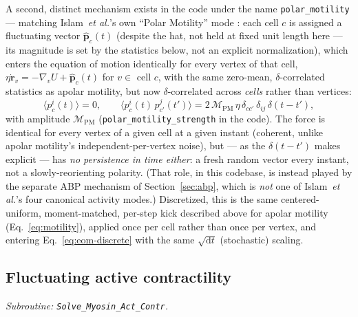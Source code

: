 \documentclass[11pt]{article}
\newcommand{\rvec}{\mathbf{r}}
\newcommand{\ord}{\mathrm{d}}
\begin{document}
A second, distinct mechanism exists in the code under the name
\texttt{polar\_motility} --- matching Islam~\emph{et al.}'s own ``Polar Motility'' mode
\cite{islam2026}: each cell $c$ is assigned a fluctuating vector $\hat{\mathbf p}_c(t)$
(despite the hat, not held at fixed unit length here --- its magnitude is set by the
statistics below, not an explicit normalization), which enters the equation of motion
identically for every vertex of that cell, $\eta\dot{\rvec}_v = -\nabla_v U +
\hat{\mathbf p}_c(t)$ for $v\in$ cell $c$, with the same zero-mean, $\delta$-correlated
statistics as apolar motility, but now $\delta$-correlated across \emph{cells} rather
than vertices:
\begin{equation}
  \big\langle p_c^{i}(t)\big\rangle = 0, \qquad
  \big\langle p_c^{i}(t)\,p_{c'}^{j}(t')\big\rangle
  = 2\,\mathcal M_{\mathrm{PM}}\,\eta\,\delta_{cc'}\,\delta_{ij}\,\delta(t-t'),
  \label{eq:polar-kick}
\end{equation}
with amplitude $\mathcal M_{\mathrm{PM}}$ (\texttt{polar\_\allowbreak motility\_\allowbreak strength}
in the code). The force is identical for every vertex of a given cell at a given
instant (coherent, unlike apolar motility's independent-per-vertex noise), but ---
as the $\delta(t-t')$ makes explicit --- has \emph{no persistence in time either}: a
fresh random vector every instant, not a slowly-reorienting polarity. (That role, in
this codebase, is instead played by the separate ABP mechanism of
Section~\ref{sec:abp}, which is \emph{not} one of Islam~\emph{et al.}'s four canonical
activity modes.) Discretized, this is the same centered-uniform, moment-matched,
per-step kick described above for apolar motility (Eq.~\eqref{eq:motility}), applied
once per cell rather than once per vertex, and entering
Eq.~\eqref{eq:eom-discrete} with the same $\sqrt{\ord t}$ (stochastic) scaling.

\subsection{Fluctuating active contractility}
\label{sec:contractility}
\textit{Subroutine: \texttt{Solve\_\allowbreak Myosin\_\allowbreak Act\_\allowbreak Contr}.}
\end{document}
